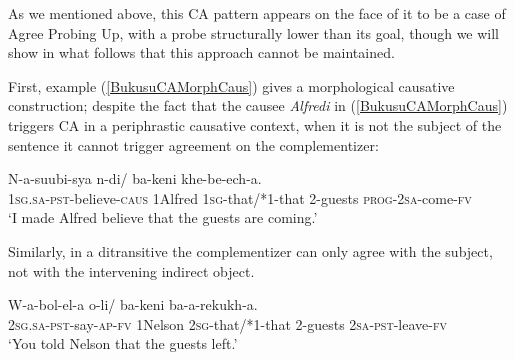 \documentclass[output=paper
,modfonts
,nonflat
]{langsci/langscibook}
\begin{document}
\z

\noindent As we mentioned above, this CA pattern appears on the face of it to be a case of Agree Probing Up, with a probe structurally lower than its goal, though we will show in what follows that this approach cannot be maintained.

First, example (\ref{BukusuCAMorphCaus}) gives a morphological causative construction; despite the fact that the causee \textit{Alfredi} in (\ref{BukusuCAMorphCaus}) triggers CA in a periphrastic causative context, when it is not the subject of the sentence it cannot trigger agreement on the complementizer:

\ea \label{BukusuCAMorphCaus}
\gll N-a-suubi-sya  n-di/ ba-keni khe-be-ech-a. \\
1\textsc{sg}.\textsc{sa}-\textsc{pst}-believe-\textsc{caus} 1Alfred 1\textsc{sg}-that/*1-that 2-guests \textsc{prog}-2\textsc{sa}-come-\textsc{fv} \\
\glt `I made Alfred believe that the guests are coming.'
\z

\noindent Similarly, in a ditransitive the complementizer can only agree with the subject, not with the intervening indirect object.

\ea \label{BukusuCADitransitive}
\gll W-a-bol-el-a  o-li/ ba-keni ba-a-rekukh-a. \\
2\textsc{sg}.\textsc{sa}-\textsc{pst}-say-\textsc{ap}-\textsc{fv}	1Nelson	2\textsc{sg}-that/*1-that	2-guests	2\textsc{sa}-\textsc{pst}-leave-\textsc{fv} \\
\glt `You told Nelson that the guests left.'
\end{document}
